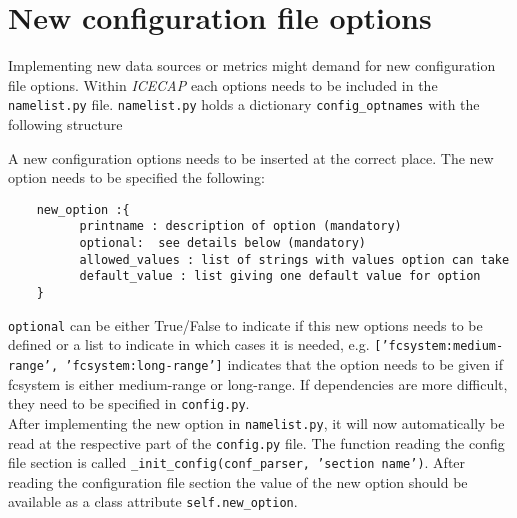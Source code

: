 \documentclass[DIV=10, parskip=full]{scrreprt}
\newcommand{\ice}{\textit{ICECAP}\xspace}
\begin{document}
\section{New configuration file options}
Implementing new data sources or metrics might demand for new configuration file options. Within \ice each options needs to be included in the \texttt{namelist.py} file.   \texttt{namelist.py} holds a dictionary \texttt{config\_optnames} with the following structure\\


A new configuration options needs to be inserted at the correct place. The new option needs to be specified the following:\\
\begin{verbatim}
	new_option :{
	      printname : description of option (mandatory)
	      optional:  see details below (mandatory)
	      allowed_values : list of strings with values option can take
	      default_value : list giving one default value for option
	}
\end{verbatim}

\texttt{optional} can be either True/False to indicate if this new options needs to be defined or a list to indicate in which cases it is needed, e.g. \texttt{['fcsystem:medium-range', 'fcsystem:long-range']} indicates that the option needs to be given if fcsystem is either medium-range or long-range. If dependencies are more difficult, they need to be specified in \texttt{config.py}.\\

After implementing the new option in \texttt{namelist.py}, it will now automatically be read at the respective part of the \texttt{config.py} file. The function reading the config file section is called \texttt{\_init\_config(conf\_parser, 'section name')}. After reading the configuration file section the value of the new option should be available as a class attribute \texttt{self.new\_option}.
\end{document}
